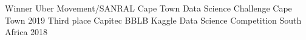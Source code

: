 \begin{cvhonors}
  \cvhonor
  {Winner}
  {Uber Movement/SANRAL Cape Town Data Science Challenge}
  {Cape Town}
  {2019}
  \cvhonor
  {Third place}
  {Capitec BBLB Kaggle Data Science Competition}
  {South Africa}
  {2018}
\end{cvhonors}
